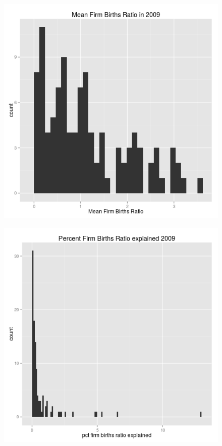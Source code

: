\documentclass[12pt,a4paper]{article}
\begin{document}
\begin{figure}[h]
    \centering
    \includegraphics[scale = 0.5]{../analysis/output/_--_birthsdiff.png}
\end{figure}

\begin{figure}[h]
    \centering
    \includegraphics[scale = 0.5]{../analysis/output/_--_taxdiff.png}
\end{figure}





\end{document}
